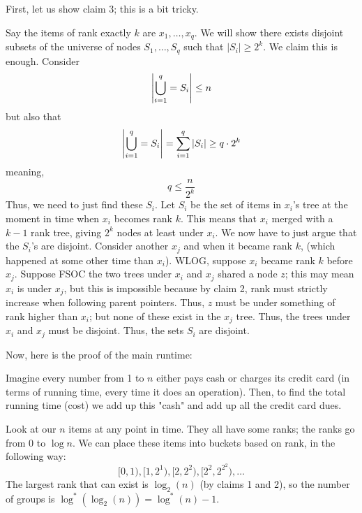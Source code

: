 \begin{algothm}
    First, let us show claim 3; this is a bit tricky.
    \begin{proof*}
        Say the items of rank exactly $k$ are $x_1, \dots, x_q$. We will show there exists disjoint subsets of the universe of nodes $S_1, \dots, S_q$ such that
        $|S_i| \geq 2^k$. We claim this is enough. Consider
        \[ \abs{\bigcup_{i = 1}^q = S_i} \leq n \]
        but also that 
        \[ \abs{\bigcup_{i = 1}^q = S_i} = \sum_{i = 1}^{q} \abs{S_i} \geq q \cdot 2^k \]
        meaning,
        \[ q \leq \frac{n}{2^k}  \]
        Thus, we need to just find these $S_i$. Let $S_i$ be the set of items in $x_i$'s tree at the moment in time when $x_i$ becomes rank $k$.
        This means that $x_i$ merged with a $k - 1$ rank tree, giving $2^k$ nodes at least under $x_i$. We now have to just argue that
        the $S_i$'s are disjoint. Consider another $x_j$ and
        when it became rank $k$, (which happened at some other time than $x_i$). WLOG, suppose $x_i$ became rank $k$ before $x_j$. Suppose FSOC the two trees under
        $x_i$ and $x_j$ shared a node $z$; this may mean $x_i$ is under $x_j$, but this is impossible because by claim 2, rank must strictly increase when following
        parent pointers. Thus, $z$ must be under something of rank higher than $x_i$; but none of these exist in the $x_j$ tree. Thus, the trees under $x_i$ and $x_j$
        must be disjoint. Thus, the sets $S_i$ are disjoint.
    \end{proof*}

    Now, here is the proof of the main runtime:
    \begin{proof*}
        Imagine every number from 1 to $n$ either pays cash or charges its credit card (in terms of running time, every time it does an operation). Then,
        to find the total running time (cost) we add up this "cash" and add up all the credit card dues.

        Look at our $n$ items at any point in time. They all have some ranks; the ranks go from 0
        to $\log n$. We can place these items into buckets based on rank, in the following way:
        \[ [0, 1), [1, 2^1), [2, 2^{2}), [2^2, 2^{2^2}), \dots \]
        The largest rank that can exist is $\log_2(n)$ (by claims 1 and 2), so the number of groups is
        $\log^*(\log_2(n)) = \log^*(n) - 1$.


\end{proof*}
\end{algothm}
